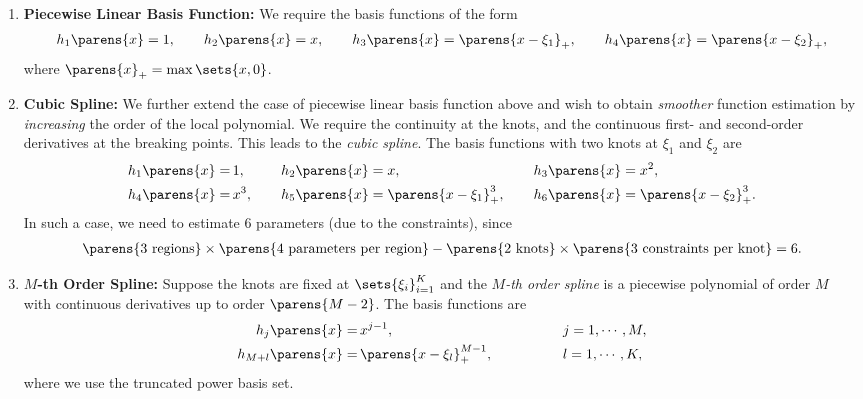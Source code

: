 \documentclass[12pt]{article}
\begin{document}
\begin{enumerate}[label=\textbf{\arabic*.}]
	\item \textbf{Piecewise Linear Basis Function:} We require the basis functions of the form 
	\begin{align*}
		h_1 \parens{x} = 1, \qquad h_2 \parens{x} = x, \qquad h_{3} \parens{x} = \parens{x - \xi_1}_+, \qquad h_{4} \parens{x} = \parens{x - \xi_2}_+, 
	\end{align*}
	where $\parens{x}_+ = \max \sets{x, 0}$. 
	
	\item \textbf{Cubic Spline:} We further extend the case of piecewise linear basis function above and wish to obtain \emph{smoother} function estimation by \textit{increasing} the order of the local polynomial. We require the continuity at the knots, and the continuous first- and second-order derivatives at the breaking points. This leads to the \textit{cubic spline}. The basis functions with two knots at $\xi_1$ and $\xi_2$ are 
	\begin{equation*}
		\begin{aligned}
			h_1 \parens{x} = & \, 1, \hspace{10pt} && \, h_2 \parens{x} = x, \hspace{10pt} && \, h_{3} \parens{x} = x^2, \\ 
			h_4 \parens{x} = & \, x^3, \hspace{10pt} && \, h_5 \parens{x} = \parens{x - \xi_1}^3_+, \hspace{10pt} && \, h_{6} \parens{x} = \parens{x - \xi_2}^3_+.  
		\end{aligned}
	\end{equation*}
	In such a case, we need to estimate 6 parameters (due to the constraints), since 
	\begin{align*}
		\parens{3 \text{ regions}} \times \parens{4 \text{ parameters per region}} - \parens{2 \text{ knots}} \times \parens{3 \text{ constraints per knot}} = 6. 
	\end{align*}
	
	\item \textbf{$M$-th Order Spline:} Suppose the knots are fixed at $\sets{ \xi_i }_{i=1}^K$ and the \emph{$M$-th order spline} is a piecewise polynomial of order $M$ with continuous derivatives up to order $ \parens{M-2}$.  The basis functions are 
	\begin{equation*}
		\begin{aligned}
			h_j \parens{x} = & \, x^{j-1}, \qquad \qquad && \, j = 1, \cdots, M, \\
			h_{M + l} \parens{x} = & \, \parens{x - \xi_l}_+^{M-1}, \qquad \qquad && \, l = 1, \cdots, K, 
		\end{aligned} 
	\end{equation*}
	where we use the truncated power basis set. 
	

\end{enumerate}
\end{document}
